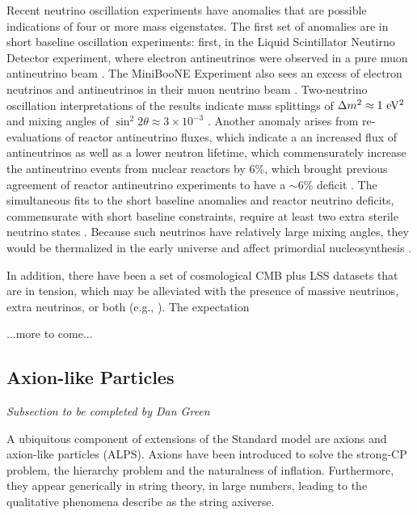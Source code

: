 Recent neutrino oscillation experiments have anomalies that are
possible indications of four or more mass eigenstates. The first set
of anomalies are in short baseline oscillation experiments: first, in
the Liquid Scintillator Neutirno Detector experiment, where electron
antineutrinos were observed in a pure muon antineutrino beam
\cite{Athanassopoulos:1997pv}. The MiniBooNE Experiment also sees an
excess of electron neutrinos and antineutrinos in their muon neutrino
beam \cite{Aguilar-Arevalo:2013pmq}. Two-neutrino oscillation
interpretations of the results indicate mass splittings of $\Delta m^2
\approx 1\rm\ eV^2$ and mixing angles of $\sin^2 2\theta \approx
3\times 10^{-3}$ \cite{Aguilar-Arevalo:2013pmq}. Another anomaly
arises from re-evaluations of reactor antineutrino fluxes, which
indicate a an increased flux of antineutrinos as well as a lower
neutron lifetime, which commensurately increase the antineutrino
events from nuclear reactors by 6\%, which brought previous agreement
of reactor antineutrino experiments to have a $\sim$6\% deficit
\cite{Mention:2011rk,Huber:2011wv}. The simultaneous fits to the short
baseline anomalies and reactor neutrino deficits, commensurate with
short baseline constraints, require at least two extra sterile
neutrino states \cite{Conrad:2012qt,Kopp:2013vaa}. Because such
neutrinos have relatively large mixing angles, they would be
thermalized in the early universe and affect primordial
nucleosynthesis \cite{Abazajian:2002bj}. 

In addition, there have been a set of cosmological CMB plus LSS
datasets that are in tension, which may be alleviated with the
presence of massive neutrinos, extra neutrinos, or both (e.g.,
\cite{Wyman:2013lza,Giusarma:2014zza}). The expectation

...more to come...

\subsection{Axion-like Particles}

{\it Subsection to be completed by Dan Green}

A ubiquitous component of extensions of the Standard model are axions and axion-like particles (ALPS).  Axions have been introduced to solve the strong-CP problem, the hierarchy problem and the naturalness of inflation.  Furthermore, they appear generically in string theory, in large numbers, leading to the qualitative phenomena describe as the string axiverse.

